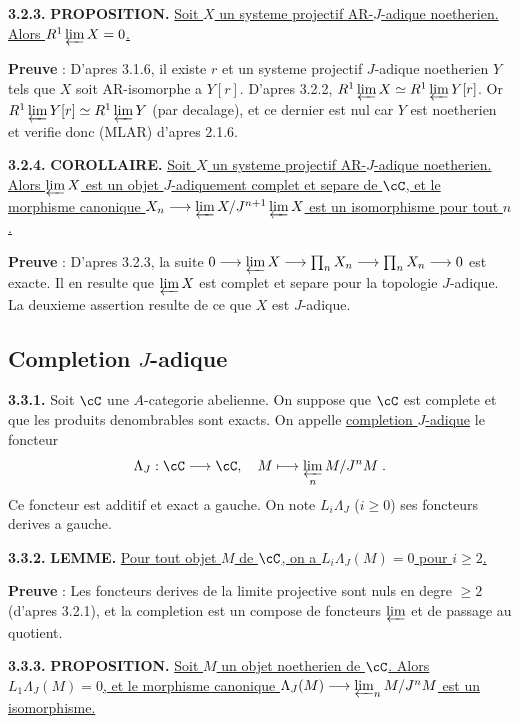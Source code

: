 \medskip
\noindent\textbf{3.2.3.} \textbf{PROPOSITION.} \underline{Soit $X$ un systeme projectif AR-$J$-adique noetherien. Alors $R^1 \varprojlim X = 0$.}

\textbf{Preuve} : D'apres 3.1.6, il existe $r$ et un systeme projectif $J$-adique noetherien $Y$ tels que $X$ soit AR-isomorphe a $Y[r]$. D'apres 3.2.2, $R^1 \varprojlim X \simeq R^1 \varprojlim Y[r]$. Or $R^1 \varprojlim Y[r] \simeq R^1 \varprojlim Y$ (par decalage), et ce dernier est nul car $Y$ est noetherien et verifie donc (MLAR) d'apres 2.1.6.

\medskip
\noindent\textbf{3.2.4.} \textbf{COROLLAIRE.} \underline{Soit $X$ un systeme projectif AR-$J$-adique noetherien. Alors $\varprojlim X$ est un objet $J$-adiquement complet et separe de $\cC$, et le morphisme canonique $X_n \longrightarrow \varprojlim X / J^{n+1} \varprojlim X$ est un isomorphisme pour tout $n$.}

\textbf{Preuve} : D'apres 3.2.3, la suite $0 \longrightarrow \varprojlim X \longrightarrow \prod_n X_n \longrightarrow \prod_n X_n \longrightarrow 0$ est exacte. Il en resulte que $\varprojlim X$ est complet et separe pour la topologie $J$-adique. La deuxieme assertion resulte de ce que $X$ est $J$-adique.

\subsection{Completion $J$-adique}

\medskip
\noindent\textbf{3.3.1.} Soit $\cC$ une $A$-categorie abelienne. On suppose que $\cC$ est complete et que les produits denombrables sont exacts. On appelle \underline{completion $J$-adique} le foncteur
\[
\Lambda_J : \cC \longrightarrow \cC, \quad M \longmapsto \varprojlim_n M/J^n M\;.
\]
Ce foncteur est additif et exact a gauche. On note $L_i \Lambda_J$ ($i \geq 0$) ses foncteurs derives a gauche.

\medskip
\noindent\textbf{3.3.2.} \textbf{LEMME.} \underline{Pour tout objet $M$ de $\cC$, on a $L_i \Lambda_J(M) = 0$ pour $i \geq 2$.}

\textbf{Preuve} : Les foncteurs derives de la limite projective sont nuls en degre $\geq 2$ (d'apres 3.2.1), et la completion est un compose de foncteurs $\varprojlim$ et de passage au quotient.

\medskip
\noindent\textbf{3.3.3.} \textbf{PROPOSITION.} \underline{Soit $M$ un objet noetherien de $\cC$. Alors $L_1 \Lambda_J(M) = 0$, et le morphisme canonique $\Lambda_J(M) \longrightarrow \varprojlim_n M/J^n M$ est un isomorphisme.}


